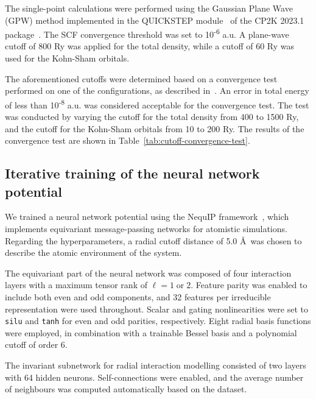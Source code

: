 The single-point calculations were performed using the Gaussian Plane Wave \; (GPW) method implemented in the QUICKSTEP module~\citep{vandevondeleQuickstepFastAccurate2005} of the CP2K 2023.1 package~\citep{kuhneCP2KElectronicStructure2020}. The SCF convergence threshold was set to 10\textsuperscript{-6} a.u. A plane-wave cutoff of 800 Ry was applied for the total density, while a cutoff of 60 Ry was used for the Kohn-Sham orbitals.

The aforementioned cutoffs were determined based on a convergence test performed on one of the configurations, as described in~\citep{cp2k_developersHowConvergeCUTOFF}. An error in total energy of less than 10\textsuperscript{-8} a.u. was considered acceptable for the convergence test. The test was conducted by varying the cutoff for the total density from 400 to 1500 Ry, and the cutoff for the Kohn-Sham orbitals from 10 to 200 Ry. The results of the convergence test are shown in Table~\ref{tab:cutoff-convergence-test}.



\subsection{Iterative training of the neural network potential} \label{subsec:iterative-training-of-the-neural-network-potential}
We trained a neural network potential using the NequIP framework~\citep{batznerE3equivariantGraphNeural2022}, which implements equivariant message-passing networks for atomistic simulations. Regarding the hyperparameters, a radial cutoff distance of 5.0 \AA\ was chosen to describe the atomic environment of the system.

The equivariant part of the neural network was composed of four interaction layers with a maximum tensor rank of $\ell = 1 \; \text{or} \; 2$. Feature parity was enabled to include both even and odd components, and 32 features per irreducible representation were used throughout. Scalar and gating nonlinearities were set to \texttt{silu} and \texttt{tanh} for even and odd parities, respectively. Eight radial basis functions were employed, in combination with a trainable Bessel basis and a polynomial cutoff of order 6.

The invariant subnetwork for radial interaction modelling consisted of two layers with 64 hidden neurons. Self-connections were enabled, and the average number of neighbours was computed automatically based on the dataset.

